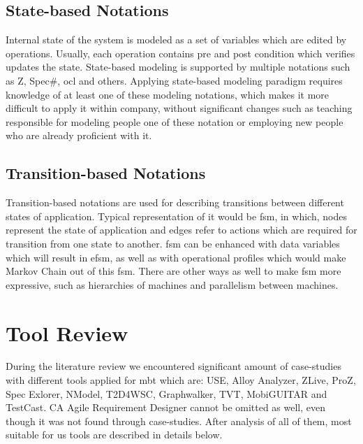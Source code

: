 \subsection{State-based Notations}
\par
Internal state of the system is modeled as a set of variables which are edited by operations. Usually, each operation contains pre and post condition which verifies updates the state\cite{Pretschner_Taxonomy}. State-based modeling is supported by multiple notations such as Z, Spec\#, \acrshort{ocl} and others. Applying state-based modeling paradigm requires knowledge of at least one of these modeling notations, which makes it more difficult to apply it within company, without significant changes such as teaching responsible for modeling people one of these notation or employing new people who are already proficient with it. 

\subsection{Transition-based Notations}
\par
Transition-based notations are used for describing transitions between different states of application. Typical representation of it would be \acrshort{fsm}, in which, nodes represent the state of application and edges refer to actions which are required for transition from one state to another. \acrshort{fsm} can be enhanced with data variables which will result in \acrshort{efsm}, as well as with operational profiles which would make Markov Chain out of this \acrshort{fsm}. There are other ways as well to make \acrshort{fsm} more expressive, such as hierarchies of machines and parallelism between machines\cite{Pretschner_Taxonomy}.

\section{Tool Review}
During the literature review we encountered significant amount of case-studies with different tools applied for \acrshort{mbt} which are: USE, Alloy Analyzer, ZLive, ProZ, Spec Exlorer, NModel, T2D4WSC, Graphwalker, TVT, MobiGUITAR and TestCast. CA Agile Requirement Designer cannot be omitted as well, even though it was not found through case-studies. After analysis of all of them, most suitable for us tools are described in details below.

